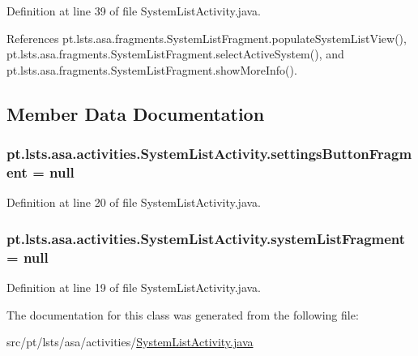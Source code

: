 Definition at line 39 of file System\+List\+Activity.\+java.



References pt.\+lsts.\+asa.\+fragments.\+System\+List\+Fragment.\+populate\+System\+List\+View(), pt.\+lsts.\+asa.\+fragments.\+System\+List\+Fragment.\+select\+Active\+System(), and pt.\+lsts.\+asa.\+fragments.\+System\+List\+Fragment.\+show\+More\+Info().



\subsection{Member Data Documentation}
\hypertarget{classpt_1_1lsts_1_1asa_1_1activities_1_1SystemListActivity_a078738718a2f7e8c64274d53cf1cb373}{}
\subsubsection[{settings\+Button\+Fragment}]{ pt.\+lsts.\+asa.\+activities.\+System\+List\+Activity.\+settings\+Button\+Fragment = null\hspace{0.3cm}{\ttfamily [private]}}\label{classpt_1_1lsts_1_1asa_1_1activities_1_1SystemListActivity_a078738718a2f7e8c64274d53cf1cb373}


Definition at line 20 of file System\+List\+Activity.\+java.

\hypertarget{classpt_1_1lsts_1_1asa_1_1activities_1_1SystemListActivity_a4eb642ad2e208d4e95a381c9993441ad}{}
\subsubsection[{system\+List\+Fragment}]{ pt.\+lsts.\+asa.\+activities.\+System\+List\+Activity.\+system\+List\+Fragment = null\hspace{0.3cm}{\ttfamily [private]}}\label{classpt_1_1lsts_1_1asa_1_1activities_1_1SystemListActivity_a4eb642ad2e208d4e95a381c9993441ad}


Definition at line 19 of file System\+List\+Activity.\+java.



The documentation for this class was generated from the following file\+:\begin{DoxyCompactItemize}
\item 
src/pt/lsts/asa/activities/\hyperlink{SystemListActivity_8java}{System\+List\+Activity.\+java}\end{DoxyCompactItemize}
